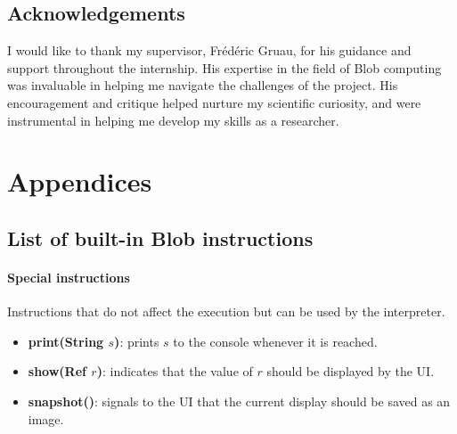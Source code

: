 \documentclass[11pt,a4paper]{report}
\begin{document}
\section{Acknowledgements}

I would like to thank my supervisor, Frédéric Gruau, for his guidance and support throughout the internship. His expertise in the field of Blob computing was invaluable in helping me navigate the challenges of the project. His encouragement and critique helped nurture my scientific curiosity, and were instrumental in helping me develop my skills as a researcher.

\printbibliography[title={References}]

\chapter*{Appendices}

\renewcommand\thesection{\Alph{section}}
\setcounter{section}{0}

\section{List of built-in Blob instructions}
\label{app:instructions}

\subsubsection{Special instructions}
Instructions that do not affect the execution but can be used by the interpreter.
\begin{itemize}
	\item \textbf{print(String $s$)}: prints $s$ to the console whenever it is reached.
	\item \textbf{show(Ref $r$)}: indicates that the value of $r$ should be displayed by the UI.
	\item \textbf{snapshot()}: signals to the UI that the current display should be saved as an image.
\end{itemize}
\end{document}
